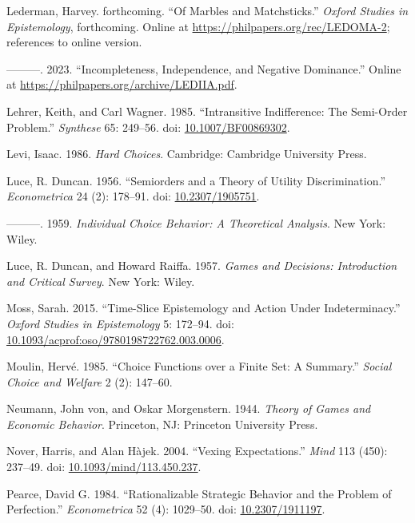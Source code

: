 \documentclass[
  11pt,
  letterpaper,
  DIV=11,
  numbers=noendperiod,
  twoside]{scrartcl}
\newlength{\cslhangindent}
\newenvironment{CSLReferences}[2] %
 {\begin{list}{}{%
  \setlength{\itemindent}{0pt}
  \setlength{\leftmargin}{0pt}
  \setlength{\parsep}{0pt}
  \ifodd #1
   \setlength{\leftmargin}{\cslhangindent}
   \setlength{\itemindent}{-1\cslhangindent}
  \fi
  \setlength{\itemsep}{#2\baselineskip}}}
 {\end{list}}
\begin{document}
\begin{CSLReferences}{1}{0}
Lederman, Harvey. forthcoming. {``Of Marbles and Matchsticks.''}
\emph{Oxford Studies in Epistemology}, forthcoming. Online at
\url{https://philpapers.org/rec/LEDOMA-2}; references to online version.

---------. 2023. {``Incompleteness, Independence, and Negative
Dominance.''} Online at \url{https://philpapers.org/archive/LEDIIA.pdf}.

Lehrer, Keith, and Carl Wagner. 1985. {``Intransitive Indifference: The
Semi-Order Problem.''} \emph{Synthese} 65: 249--56. doi:
\href{https://doi.org/10.1007/BF00869302}{10.1007/BF00869302}.

Levi, Isaac. 1986. \emph{Hard Choices}. Cambridge: Cambridge University
Press.

Luce, R. Duncan. 1956. {``Semiorders and a Theory of Utility
Discrimination.''} \emph{Econometrica} 24 (2): 178--91. doi:
\href{https://doi.org/10.2307/1905751}{10.2307/1905751}.

---------. 1959. \emph{Individual Choice Behavior: A Theoretical
Analysis}. New York: Wiley.

Luce, R. Duncan, and Howard Raiffa. 1957. \emph{Games and Decisions:
Introduction and Critical Survey}. New York: Wiley.

Moss, Sarah. 2015. {``Time-Slice Epistemology and Action Under
Indeterminacy.''} \emph{Oxford Studies in Epistemology} 5: 172--94. doi:
\href{https://doi.org/10.1093/acprof:oso/9780198722762.003.0006}{10.1093/acprof:oso/9780198722762.003.0006}.

Moulin, Hervé. 1985. {``Choice Functions over a Finite Set: A
Summary.''} \emph{Social Choice and Welfare} 2 (2): 147--60.

Neumann, John von, and Oskar Morgenstern. 1944. \emph{Theory of Games
and Economic Behavior}. Princeton, NJ: Princeton University Press.

Nover, Harris, and Alan Hàjek. 2004. {``Vexing Expectations.''}
\emph{Mind} 113 (450): 237--49. doi:
\href{https://doi.org/10.1093/mind/113.450.237}{10.1093/mind/113.450.237}.

Pearce, David G. 1984. {``Rationalizable Strategic Behavior and the
Problem of Perfection.''} \emph{Econometrica} 52 (4): 1029--50. doi:
\href{https://doi.org/10.2307/1911197}{10.2307/1911197}.


\end{CSLReferences}
\end{document}
